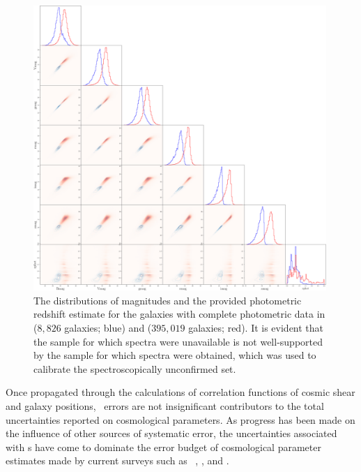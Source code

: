 \begin{figure}
	\begin{center}
		\includegraphics[width=0.99\textwidth]{figures/intro/big_corner_coarse.png}
		\caption{
			The distributions of magnitudes and the provided photometric redshift estimate for the galaxies with complete photometric data in  ($8,826$ galaxies; blue) and  ($395,019$ galaxies; red).
			It is evident that the sample for which spectra were unavailable is not well-supported by the sample for which spectra were obtained, which was used to calibrate the spectroscopically unconfirmed set.
		}
	\end{center}
\end{figure}

Once propagated through the calculations of correlation functions of cosmic shear and galaxy positions, \pz\ errors are not insignificant contributors to the total uncertainties reported on cosmological parameters.
As progress has been made on the influence of other sources of systematic error, the uncertainties associated with \pz s have come to dominate the error budget of cosmological parameter estimates made by current surveys such as \des\ \citep{hoyle_dark_2017},  \citep{tanaka_photometric_2018}, and  \citep{hildebrandt_kids-450:_2017}.

